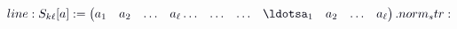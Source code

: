 \documentclass[12pt]{article}
\begin{document}
\makeatletter
\renewcommand*{\@textcolor}[3]{%
  \protect\leavevmode
  \begingroup
    \color#1{#2}#3%
  \endgroup
}
\makeatother
\begin{displaymath}
\mathcolor[RGB]{0,0,15}{line:
S_{k\ell}[a]:=\begin{pmatrix}a_1&a_2&\ldots&a_\ell\ldots&\ldots&\ldots&\ldotsa_1&a_2&\ldots&a_\ell\end{pmatrix}.

norm_str:}
\end{displaymath}
\end{document}

